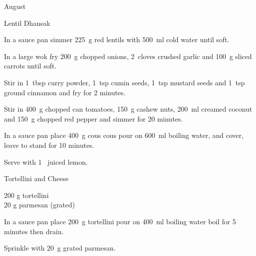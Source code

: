 \begin{menu}{August}
\begin{recipe}{2}{Lentil Dhansak}
	
	
    \begin{instructions}
    \item 
        In a sauce pan simmer
        225~g  red lentils
        with 500~ml  cold water
        until soft.
      \item 
        In a large wok fry
        200~g chopped onions,
        2~cloves crushed garlic
        and
        100~g sliced carrots
        until soft.
      \item 
        Stir in
        1~tbsp  curry powder,
        1~tsp  cumin seeds,
        1~tsp  mustard seeds
        and
        1~tsp  ground cinnamon
        and fry for 2 minutes.
      \item 
        Stir in
        400~g chopped can tomatoes,
        150~g  cashew nuts,
        200~ml  creamed coconut
        and
        150~g chopped red pepper
        and simmer for 20 minutes.
      \item 
    In a
    sauce pan 
    place
    400~g  cous cous
    pour on
    600~ml  boiling water,
    and cover, leave to stand for 10 minutes.
  \item 
        Serve with
        1~ juiced lemon.
      
    \end{instructions}
    \end{recipe}%
  
    \begin{recipe}{1}{Tortellini and Cheese}%
		\begin{ingredients}
		200 g tortellini  \\
	20 g parmesan (grated) \\
	
		\end{ingredients}
	
	
    \begin{instructions}
    \item 
    In a
    sauce pan
    place
    200~g  tortellini
    pour on
    400~ml  boiling water
    boil for 5 minutes then drain.
  \item 
        Sprinkle with
        20~g grated parmesan.
      
    \end{instructions}
    \end{recipe}%
  
    \clearpage
    \end{menu}
	
